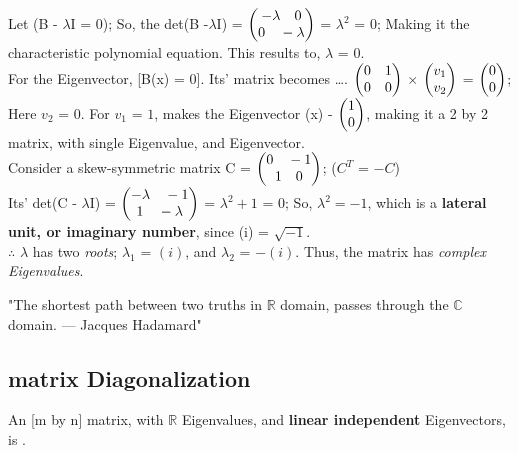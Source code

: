 \documentclass[a4paper, 10pt, onepage]{elegantbook}
\begin{document}
{Let (B - $\lambda$I = 0); So, the det(B -$\lambda$I) = $\begin{pmatrix} - \lambda \quad 0 \cr 0 \quad - \lambda 
\end{pmatrix}$ = $\lambda^2$ = $0$; Making it the characteristic polynomial equation. This results to, $\lambda$ = $0$. 
 \\

For the Eigenvector, [B(x) = 0]. Its' matrix becomes \ldots. $\begin{pmatrix}0 \quad 1 \cr 0 \quad 0 \end{pmatrix}$ 
$\times$ $\begin{pmatrix}v_1 \cr v_2 \end{pmatrix}$ = $\begin{pmatrix}0 \cr 0 \end{pmatrix}$; Here $v_2$ = $0$. For 
$v_1$ = $1$, makes the Eigenvector (x) - $\begin{pmatrix}1 \cr 0 \end{pmatrix}$, making it a 2 by 2 matrix, with single 
Eigenvalue, and Eigenvector. \\

Consider a skew-symmetric matrix C = $\begin{pmatrix}0 \quad -1 \cr 1 \quad 0 \end{pmatrix}$; ($C^T$ = $-C$)  \\

Its' det(C - $\lambda$I) = $\begin{pmatrix} - \lambda \quad -1 \cr 1 \quad - \lambda \end{pmatrix}$ = $\lambda^2 + 1$ = 
$0$; So, $\boxed{\lambda^2 = -1}$, which is a \textbf{lateral unit, or imaginary number}, since (i) = $\sqrt{-1}$.  \\

$\therefore$ $\lambda$ has two \emph{roots}; $\lambda_1$ = $(i)$, and $\lambda_2$ = $ - (i)$. Thus, the matrix has 
\emph{complex Eigenvalues}.  

"The shortest path between two truths in $\mathbb{R}$ domain, passes through the $\mathbb{C}$ domain. --- Jacques 
Hadamard"

\subsection{matrix Diagonalization}

An [m by n] matrix, with $\mathbb{R}$ Eigenvalues, and \textbf{linear independent} Eigenvectors, is .  

}
\end{document}
